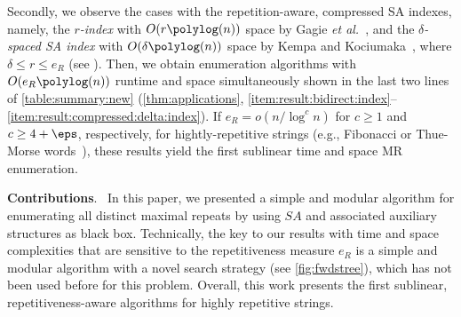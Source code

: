 Secondly, we observe the cases with the repetition-aware, compressed SA indexes, namely,
the \textit{$r$-index} with $O(r\polylog(n))$ space by Gagie \textit{et al.}~\cite{gagie:navarro:prezza2020fully}, and
the \textit{$\delta$-spaced SA index} with $O(\delta\polylog(n))$ space by Kempa and Kociumaka~\cite{kempa:kociumaka2023collapsing}, where $\delta \le r \le e_R$ (see \cite{kociumaka:navarro:olivares2024near:delta:optimal,kempa2018roots,belazzougui:cunial:gagie:prezza:raffinot2015composite}).
Then, we obtain enumeration algorithms with $O(e_R\polylog(n))$ runtime and space simultaneously shown in the last two lines of \cref{table:summary:new} (\cref{thm:applications}, \ref{item:result:bidirect:index}--\ref{item:result:compressed:delta:index}). 
If $e_R = o(n/\log^c n)$ for $c\ge 1$ and $c\ge 4+\eps$, respectively, for hightly-repetitive strings (e.g., Fibonacci or Thue-Morse words~\cite{radoszewski:rytter2012structure:cdawg:thuemorse}), these results yield the first sublinear time and space MR enumeration. 


\textbf{Contributions}.\ 
In this paper, we presented a simple and modular algorithm for enumerating all distinct maximal repeats by using $SA$ and associated auxiliary structures as black box.
Technically, the key to our results with time and space complexities that are  sensitive to the repetitiveness measure $e_R$ is a simple and modular algorithm with a novel search strategy (see \cref{fig:fwdstree}), which has not been used before for this problem. 
Overall, this work presents the first sublinear, repetitiveness-aware algorithms for highly repetitive strings.



